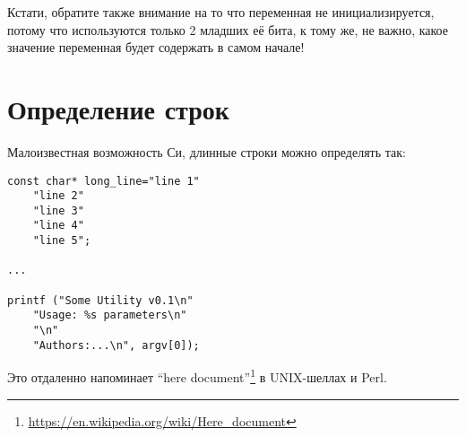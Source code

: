 Кстати, обратите также внимание на то что переменная  не инициализируется, потому что используются только 
2 младших её бита, к тому же, не важно, какое значение переменная будет содержать в самом начале!

\section{Определение строк}

\label{heredoc}
Малоизвестная возможность Си, длинные строки можно определять так:

\begin{lstlisting}
const char* long_line="line 1"
	"line 2"
	"line 3"
	"line 4"
	"line 5";

...

printf ("Some Utility v0.1\n"
	"Usage: %s parameters\n"
	"\n"
	"Authors:...\n", argv[0]);
\end{lstlisting}

Это отдаленно напоминает ``here document''\footnote{\url{https://en.wikipedia.org/wiki/Here_document}} в 
UNIX-шеллах и Perl.

